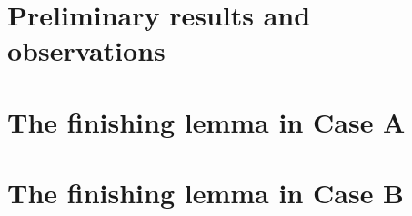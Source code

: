 \documentclass{article}
\theoremstyle{definition}
\begin{document}
\section{Preliminary results and observations}\label{sec:prelim}








\section{The finishing lemma in Case A}\label{sec:finishA}





\section{The finishing lemma in Case B}\label{sec:finishB}





\end{document}
